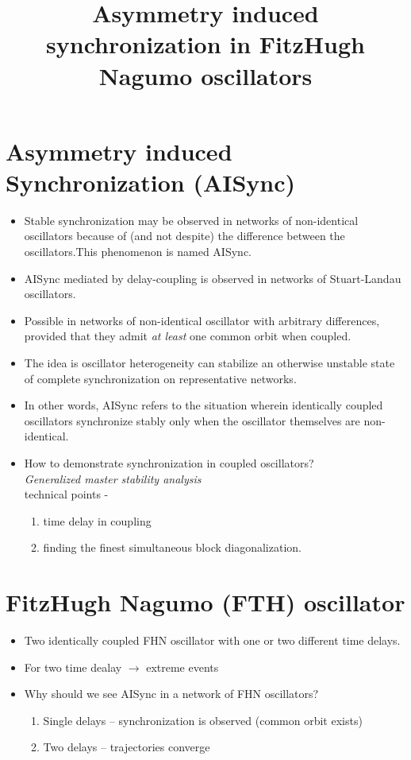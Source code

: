 \documentclass[12pt,a4paper,final]{article}
\date{}
\title{Asymmetry induced synchronization in FitzHugh Nagumo oscillators}
\begin{document}
    \maketitle
\section*{Asymmetry induced Synchronization (AISync)}
\begin{itemize}
    \item Stable synchronization may be observed in networks of non-identical 
    oscillators because of (and not despite) the difference between the 
    oscillators.This phenomenon is named AISync.
    \item AISync mediated by delay-coupling is observed in networks of 
    Stuart-Landau oscillators.
    \item  Possible in networks of non-identical oscillator with arbitrary 
    differences, provided that they admit {\it at least} one common orbit when 
    coupled.
    \item The idea is oscillator heterogeneity can stabilize an otherwise 
    unstable state of complete synchronization on representative networks.
    \item In other words, AISync refers to the situation wherein identically 
    coupled oscillators synchronize stably only when the oscillator themselves 
    are non-identical.
    \item How to demonstrate synchronization in coupled oscillators? \\
     {\it Generalized master stability analysis}\\
     technical points -
     \begin{enumerate}[label=(\alph*)]
     \item time delay in coupling
     \item finding the finest simultaneous block diagonalization.
    \end{enumerate}
\end{itemize}

\section*{FitzHugh Nagumo (FTH) oscillator}
\begin{itemize}
    \item Two identically coupled FHN oscillator with one or two different 
    time delays.
    \item For two time dealay $\rightarrow$ extreme events
    \item Why should we see AISync in a network of FHN oscillators?
    \begin{enumerate}[label=(\alph*)]
    \item Single delays -- synchronization is observed (common orbit exists)
    \item Two delays -- trajectories converge
    \end{enumerate}
\end{itemize}
\end{document}
